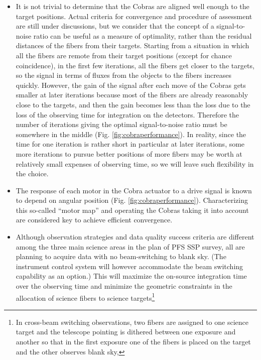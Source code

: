 \documentclass[a4paper]{article}
\begin{document}
\begin{itemize}
\item It is not trivial to determine that the Cobras are aligned well
  enough to the target positions. Actual criteria for convergence and
  procedure of assessment are still under discussions, but we
  consider that the concept of a signal-to-noise ratio can be useful
  as a measure of optimality, rather than the residual distances of
  the fibers from their targets. Starting from a situation in which
  all the fibers are remote from their target positions (except for
  chance coincidence), in the first few iterations, all the fibers get
  closer to the targets, so the signal in terms of fluxes from the
  objects to the fibers increases quickly. However, the gain of the
  signal after each move of the Cobras gets smaller at later
  iterations because most of the fibers are already reasonably close
  to the targets, and then the gain becomes less than the loss due to
  the loss of the observing time for integration on the
  detectors. Therefore the number of iterations giving the optimal
  signal-to-noise ratio must be somewhere in the middle
  (Fig. \ref{fig:cobraperformance}). In reality, since the time for
  one iteration is rather short in particular at later iterations,
  some more iterations to pursue better positions of more fibers may
  be worth at relatively small expenses of observing time, so we will
  leave such flexibility in the choice.
\item The response of each motor in the Cobra actuator to a drive
  signal is known to depend on angular position
  (Fig. \ref{fig:cobraperformance}). Characterizing this so-called
  ``motor map'' and operating the Cobras taking it into account are
  considered key to achieve efficient convergence.
\item Although observation strategies and data quality success
  criteria are different among the three main science areas in the
  plan of PFS SSP survey\cite{takada14}, all are planning to acquire
  data with no beam-switching to blank sky. (The instrument control
  system will however accommodate the beam switching capability as an
  option.)  This will maximize the on-source integration time over the
  observing time and minimize the geometric constraints in the
  allocation of science fibers to science targets\footnote{In
    cross-beam switching observations, two fibers are assigned to one
    science target and the telescope pointing is dithered between one
    exposure and another so that in the first exposure one of the
    fibers is placed on the target and the other observes blank sky,
}
\end{itemize}
\end{document}

